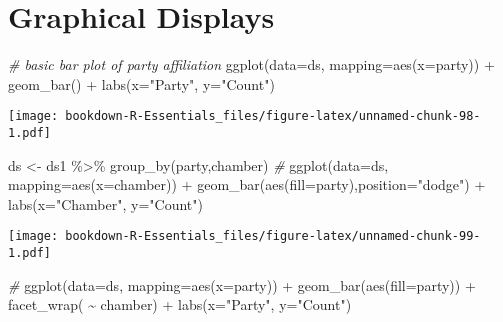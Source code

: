 \documentclass[
]{book}
\newenvironment{Shaded}{\begin{snugshade}}{\end{snugshade}}
\newcommand{\AttributeTok}[1]{\textcolor[rgb]{0.77,0.63,0.00}{#1}}
\newcommand{\CommentTok}[1]{\textcolor[rgb]{0.56,0.35,0.01}{\textit{#1}}}
\newcommand{\FunctionTok}[1]{\textcolor[rgb]{0.00,0.00,0.00}{#1}}
\newcommand{\NormalTok}[1]{#1}
\newcommand{\OtherTok}[1]{\textcolor[rgb]{0.56,0.35,0.01}{#1}}
\newcommand{\SpecialCharTok}[1]{\textcolor[rgb]{0.00,0.00,0.00}{#1}}
\newcommand{\StringTok}[1]{\textcolor[rgb]{0.31,0.60,0.02}{#1}}
\begin{document}
\hypertarget{graphical-displays}{%
\section{Graphical Displays}\label{graphical-displays}}

\begin{Shaded}
\begin{Highlighting}[]
\CommentTok{\# basic bar plot of party affiliation}
\FunctionTok{ggplot}\NormalTok{(}\AttributeTok{data=}\NormalTok{ds, }\AttributeTok{mapping=}\FunctionTok{aes}\NormalTok{(}\AttributeTok{x=}\NormalTok{party)) }\SpecialCharTok{+} 
  \FunctionTok{geom\_bar}\NormalTok{() }\SpecialCharTok{+}
  \FunctionTok{labs}\NormalTok{(}\AttributeTok{x=}\StringTok{"Party"}\NormalTok{, }\AttributeTok{y=}\StringTok{"Count"}\NormalTok{)}
\end{Highlighting}
\end{Shaded}

\texttt{[image: bookdown-R-Essentials\_files/figure-latex/unnamed-chunk-98-1.pdf]}

\begin{Shaded}
\begin{Highlighting}[]
\NormalTok{ds }\OtherTok{\textless{}{-}}\NormalTok{ ds1 }\SpecialCharTok{\%\textgreater{}\%} \FunctionTok{group\_by}\NormalTok{(party,chamber)}
\CommentTok{\#}
\FunctionTok{ggplot}\NormalTok{(}\AttributeTok{data=}\NormalTok{ds, }\AttributeTok{mapping=}\FunctionTok{aes}\NormalTok{(}\AttributeTok{x=}\NormalTok{chamber)) }\SpecialCharTok{+} 
  \FunctionTok{geom\_bar}\NormalTok{(}\FunctionTok{aes}\NormalTok{(}\AttributeTok{fill=}\NormalTok{party),}\AttributeTok{position=}\StringTok{"dodge"}\NormalTok{) }\SpecialCharTok{+}
  \FunctionTok{labs}\NormalTok{(}\AttributeTok{x=}\StringTok{"Chamber"}\NormalTok{, }\AttributeTok{y=}\StringTok{"Count"}\NormalTok{)}
\end{Highlighting}
\end{Shaded}

\texttt{[image: bookdown-R-Essentials\_files/figure-latex/unnamed-chunk-99-1.pdf]}

\begin{Shaded}
\begin{Highlighting}[]
\CommentTok{\#}
\FunctionTok{ggplot}\NormalTok{(}\AttributeTok{data=}\NormalTok{ds, }\AttributeTok{mapping=}\FunctionTok{aes}\NormalTok{(}\AttributeTok{x=}\NormalTok{party)) }\SpecialCharTok{+} 
  \FunctionTok{geom\_bar}\NormalTok{(}\FunctionTok{aes}\NormalTok{(}\AttributeTok{fill=}\NormalTok{party)) }\SpecialCharTok{+}
  \FunctionTok{facet\_wrap}\NormalTok{( }\SpecialCharTok{\textasciitilde{}}\NormalTok{ chamber) }\SpecialCharTok{+}
  \FunctionTok{labs}\NormalTok{(}\AttributeTok{x=}\StringTok{"Party"}\NormalTok{, }\AttributeTok{y=}\StringTok{"Count"}\NormalTok{)}
\end{Highlighting}
\end{Shaded}
\end{document}
